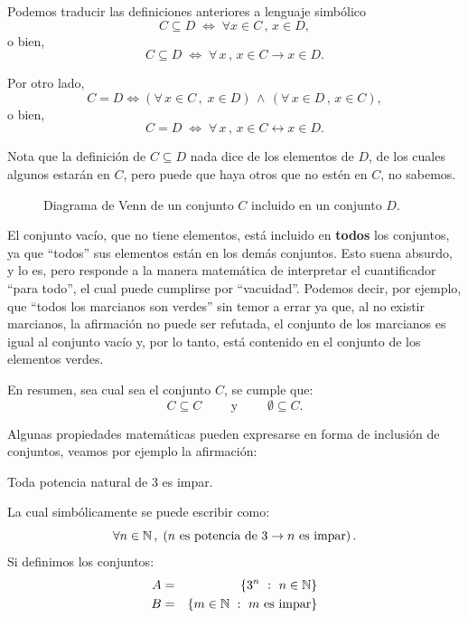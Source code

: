 Podemos traducir las definiciones anteriores a lenguaje simb\'olico
$$C\subseteq D \; \Leftrightarrow\; \forall x \in C\, ,\,x \in D,$$
o bien,
\[
	C \subseteq D\;\Leftrightarrow\; \forall\, x \,,\,
	x \in C \rightarrow x \in D.
\]

Por otro lado,
\[
	C = D \Leftrightarrow \left(\forall\, x\in C\, ,\; x \in D\right)
	\,\wedge\,\left(\forall\, x \in D\, ,\, x \in C\right),
\]
o bien,
\[
	C = D\;\Leftrightarrow\; \forall\, x \, ,\,
		x \in C \leftrightarrow x \in D.
\]

Nota que la definici\'on de $C\subseteq D$ 
nada dice de los elementos de $D$, 
de los cuales algunos estarán en $C$, 
pero puede que haya otros que no estén en $C$, no sabemos.

\begin{center}
	\begin{figure}[h!]
		\begin{center}
		\end{center}
		\caption{Diagrama de Venn de un conjunto $C$ incluido en un conjunto $D$.}
	\end{figure}
\end{center}

El conjunto vacío, que no tiene elementos, 
está incluido en \textbf{todos} los conjuntos, 
ya que ``todos'' sus elementos están en los demás conjuntos. 
Esto suena absurdo, y lo es, 
pero responde a la manera matemática de interpretar el cuantificador 
``para todo'', el cual puede cumplirse por ``vacuidad''.
Podemos decir, por ejemplo, que 
``todos los marcianos son verdes'' sin temor a errar 
ya que, al no existir marcianos, 
la afirmación no puede ser refutada, 
el conjunto de los marcianos es igual al conjunto vacío y, por lo tanto, 
está contenido en el conjunto de los elementos verdes.

En resumen, sea cual sea el conjunto $C$, se cumple que:
$$C\subseteq C\qquad \textrm{ y } \qquad \emptyset\subseteq C.$$

Algunas propiedades matemáticas pueden expresarse 
en forma de inclusión de conjuntos, veamos por ejemplo la afirmación:

\centerline{ Toda potencia natural de 3 es impar.}

La cual simbólicamente se puede escribir como:
$$\forall n\in \mathbb{N}\, ,\; 
\left(n\textrm{ es potencia de 3} \rightarrow n\textrm{ es impar}\right).$$
Si definimos los conjuntos:
\begin{eqnarray*} 
	A &=& \{3^n\ :\ n\in \mathbb{N}\}\\
	B &=& \{ m\in\mathbb{N}\ :\ m \textrm{ es impar}\}
\end{eqnarray*}

